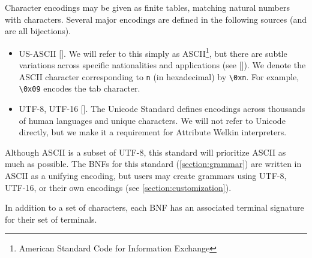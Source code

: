 Character encodings may be given as finite tables, matching natural numbers with characters. Several major encodings are defined in the following sources (and are all bijections).
\begin{itemize}
	\item US-ASCII [].
        We will refer to this simply as ASCII\footnote{American Standard Code for Information Exchange}, but there are subtle variations across specific nationalities and applications (see []). We denote the ASCII character corresponding to \texttt{n} (in hexadecimal) by \texttt{\textbackslash0xn}. For example, \texttt{\textbackslash0x09} encodes the tab character.
	\item UTF-8, UTF-16 []. The Unicode Standard defines encodings across thousands of human languages and unique characters. We will not refer to Unicode directly, but we make it a requirement for Attribute Welkin interpreters.
\end{itemize}


Although ASCII is a subset of UTF-8, this standard will prioritize ASCII as much as possible. The BNFs for this standard (\ref{section:grammar}) are written in ASCII as a unifying encoding, but users may create grammars using UTF-8, UTF-16, or their own encodings (see \ref{section:customization}).

In addition to a set of characters, each BNF has an associated terminal signature for their set of terminals.

